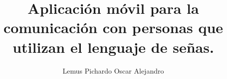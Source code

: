 \documentclass[letterpaper,12pt,spanish]{article}
\title{Aplicación móvil para la comunicación con personas que utilizan el lenguaje de señas.}
\author{Lemus Pichardo Oscar Alejandro}
\begin{document}
%
%
%




\tableofcontents %

\newpage
\listoffigures %

\listoftables %
\renewcommand{\thesection}{\Roman{section}} 





\renewcommand{\thesection}{\arabic{section}} 







\newpage

\renewcommand{\bibname}{Bibliography}

\end{document}
